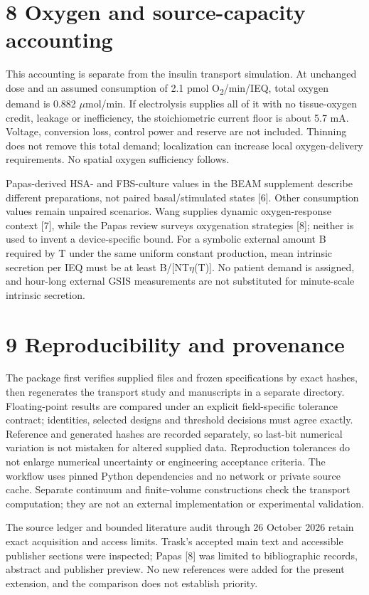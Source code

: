 \documentclass[11pt]{article}
\begin{document}
\section*{8 Oxygen and source-capacity accounting}
This accounting is separate from the insulin transport simulation. At unchanged dose and an assumed consumption of 2.1 pmol O\textsubscript{2}/min/IEQ, total oxygen demand is 0.882 \ensuremath{\mu}mol/min. If electrolysis supplies all of it with no tissue-oxygen credit, leakage or inefficiency, the stoichiometric current floor is about 5.7 mA. Voltage, conversion loss, control power and reserve are not included. Thinning does not remove this total demand; localization can increase local oxygen-delivery requirements. No spatial oxygen sufficiency follows.

Papas-derived HSA- and FBS-culture values in the BEAM supplement describe different preparations, not paired basal/stimulated states [6]. Other consumption values remain unpaired scenarios. Wang supplies dynamic oxygen-response context [7], while the Papas review surveys oxygenation strategies [8]; neither is used to invent a device-specific bound. For a symbolic external amount B required by T under the same uniform constant production, mean intrinsic secretion per IEQ must be at least B/[NT\ensuremath{\eta}(T)]. No patient demand is assigned, and hour-long external GSIS measurements are not substituted for minute-scale intrinsic secretion.

\section*{9 Reproducibility and provenance}
The package first verifies supplied files and frozen specifications by exact hashes, then regenerates the transport study and manuscripts in a separate directory. Floating-point results are compared under an explicit field-specific tolerance contract; identities, selected designs and threshold decisions must agree exactly. Reference and generated hashes are recorded separately, so last-bit numerical variation is not mistaken for altered supplied data. Reproduction tolerances do not enlarge numerical uncertainty or engineering acceptance criteria. The workflow uses pinned Python dependencies and no network or private source cache. Separate continuum and finite-volume constructions check the transport computation; they are not an external implementation or experimental validation.

The source ledger and bounded literature audit through 26 October 2026 retain exact acquisition and access limits. Trask’s accepted main text and accessible publisher sections were inspected; Papas [8] was limited to bibliographic records, abstract and publisher preview. No new references were added for the present extension, and the comparison does not establish priority.
\end{document}
